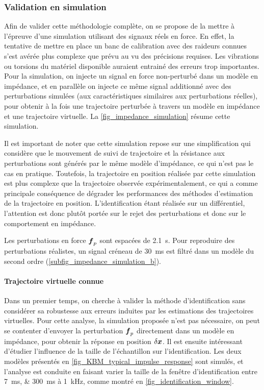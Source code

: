 \subsubsection{Validation en simulation} \label{chap3_sec_method_sub_ident_2}

Afin de valider cette méthodologie complète, on se propose de la mettre à l'épreuve d'une simulation utilisant des signaux réels en force. En effet, la tentative de mettre en place un banc de calibration avec des raideurs connues s'est avérée plus complexe que prévu au vu des précisions requises. Les vibrations ou torsions du matériel disponible auraient entrainé des erreurs trop importantes. Pour la simulation, on injecte un signal en force non-perturbé dans un modèle en impédance, et en parallèle on injecte ce même signal additionné avec des perturbations simulées (aux caractéristiques similaires aux perturbations réelles), pour obtenir à la fois une trajectoire perturbée à travers un modèle en impédance et une trajectoire virtuelle. La \cref{fig_impedance_simulation} résume cette simulation.



Il est important de noter que cette simulation repose sur une simplification qui considère que le mouvement de suivi de trajectoire et la résistance aux perturbations sont générés par le même modèle d'impédance, ce qui n'est pas le cas en pratique. Toutefois, la trajectoire en position réalisée par cette simulation est plus complexe que la trajectoire observée expérimentalement, ce qui a comme principale conséquence de dégrader les performances des méthodes d'estimation de la trajectoire en position. L'identification étant réalisée sur un différentiel, l'attention est donc plutôt portée sur le rejet des perturbations et donc sur le comportement en impédance.

Les perturbations en force $\vect{f}_p$ sont espacées de \SI{2.1}{\second}. Pour reproduire des perturbations réalistes, un signal créneau de \SI{30}{\milli\second} est filtré dans un modèle du second ordre (\cref{subfig_impedance_simulation_b}).

\paragraph{Trajectoire virtuelle connue} \label{chap3_sec_method_sub_ident_2_1}

Dans un premier temps, on cherche à valider la méthode d'identification sans considérer sa robustesse aux erreurs induites par les estimations des trajectoires virtuelles. Pour cette analyse, la simulation proposée n'est pas nécessaire, on peut se contenter d'envoyer la perturbation $\vect{f}_p$ directement dans un modèle en impédance, pour obtenir la réponse en position $\delta \vect{x}$. Il est ensuite intéressant d'étudier l'influence de la taille de l'échantillon sur l'identification. Les deux modèles présentés en \cref{fig_KBM_typical_impulse_response} sont simulés, et l'analyse est conduite en faisant varier la taille de la fenêtre d'identification entre \SIlist{7;300}{\milli\second} à \SI{1}{\kilo\hertz}, comme montré en \cref{fig_identification_window}.

